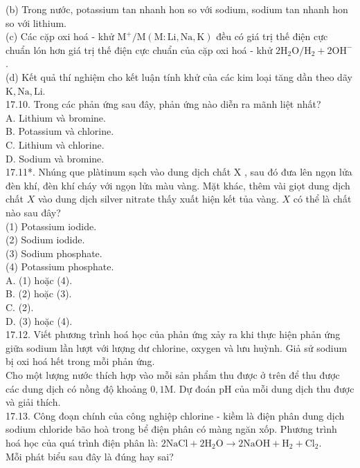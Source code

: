 \documentclass[10pt]{article}
\begin{document}
(b) Trong nước, potassium tan nhanh hon so với sodium, sodium tan nhanh hon so với lithium.\\
(c) Các cặp oxi hoá - khử $\mathrm{M}^{+} / \mathrm{M}(\mathrm{M}: \mathrm{Li}, \mathrm{Na}, \mathrm{K})$ đều có giá trị thế điện cực chuẩn lón hơn giá trị thế điện cực chuẩn của cặp oxi hoá - khử $2 \mathrm{H}_{2} \mathrm{O} / \mathrm{H}_{2}+2 \mathrm{OH}^{-}$.\\
(d) Kết quả thí nghiệm cho kết luận tính khử của các kim loại tăng dần theo dãy $\mathrm{K}, \mathrm{Na}, \mathrm{Li}$.\\
17.10. Trong các phản ứng sau đây, phản ứng nào diễn ra mãnh liệt nhất?\\
A. Lithium và bromine.\\
B. Potassium và chlorine.\\
C. Lithium và chlorine.\\
D. Sodium và bromine.\\
17.11*. Nhúng que plàtinum sạch vào dung dịch chất X , sau đó đưa lên ngọn lửa đèn khí, đèn khí cháy với ngọn lửa màu vàng. Mặt khác, thêm vài giọt dung dịch chất $X$ vào dung dịch silver nitrate thấy xuất hiện kết tủa vàng. $X$ có thể là chất nào sau đây?\\
(1) Potassium iodide.\\
(2) Sodium iodide.\\
(3) Sodium phosphate.\\
(4) Potassium phosphate.\\
A. (1) hoặc (4).\\
B. (2) hoặc (3).\\
C. (2).\\
D. (3) hoặc (4).\\
17.12. Viết phương trình hoá học của phản ứng xảy ra khi thực hiện phản ứng giữa sodium lần lượt với lượng dư chlorine, oxygen và lưu huỳnh. Giả sử sodium bị oxi hoá hết trong mỗi phản ứng.\\
Cho một lượng nước thích hợp vào mỗi sản phẩm thu được ở trên để thu được các dung dịch có nồng độ khoảng $0,1 \mathrm{M}$. Dự đoán pH của mỗi dung dịch thu được và giải thích.\\
17.13. Công đoạn chính của công nghiệp chlorine - kiềm là điện phân dung dịch sodium chloride bão hoà trong bể điện phân có màng ngăn xốp. Phương trình hoá học của quá trình điện phân là: $2 \mathrm{NaCl}+2 \mathrm{H}_{2} \mathrm{O} \rightarrow 2 \mathrm{NaOH}+\mathrm{H}_{2}+\mathrm{Cl}_{2}$.\\
Mỗi phát biểu sau đây là đúng hay sai?\\
\end{document}
